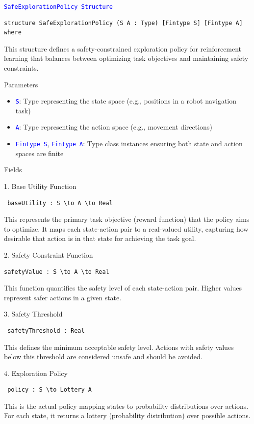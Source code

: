 \documentclass{article}
\theoremstyle{definition}
\newcommand{\tactic}[1]{\textcolor{blue}{\texttt{#1}}}
\begin{document}
\tactic{SafeExplorationPolicy Structure}
\begin{lstlisting}
structure SafeExplorationPolicy (S A : Type) [Fintype S] [Fintype A] where
\end{lstlisting}
This structure defines a safety-constrained exploration policy for reinforcement learning that balances between optimizing task objectives and maintaining safety constraints.

Parameters

\begin{itemize}
  \item \tactic{S}: Type representing the state space (e.g., positions in a robot navigation task)
  \item \tactic{A}: Type representing the action space (e.g., movement directions)
  \item \tactic{Fintype S}, \tactic{Fintype A}: Type class instances ensuring both state and action spaces are finite
\end{itemize}

Fields

1. Base Utility Function
\begin{lstlisting}
 baseUtility : S \to A \to Real
\end{lstlisting}
This represents the primary task objective (reward function) that the policy aims to optimize. It maps each state-action pair to a real-valued utility, capturing how desirable that action is in that state for achieving the task goal.

2.  Safety Constraint Function
\begin{lstlisting}
safetyValue : S \to A \to Real
\end{lstlisting}
This function quantifies the safety level of each state-action pair. Higher values represent safer actions in a given state.

3. Safety Threshold
\begin{lstlisting}
 safetyThreshold : Real
\end{lstlisting}
This defines the minimum acceptable safety level. Actions with safety values below this threshold are considered unsafe and should be avoided.

4. Exploration Policy
\begin{lstlisting}
 policy : S \to Lottery A
\end{lstlisting}
This is the actual policy mapping states to probability distributions over actions. For each state, it returns a lottery (probability distribution) over possible actions.
\end{document}
